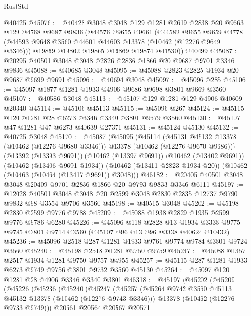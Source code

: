 \begin{lexlean}{RustStd}
\begin{coremodule}
    @40425
@45076 := @40428
    @3048
    @3048
    @129
    @1281
    @2619
    @2838
    @20
    @9663
    @129
    @4768
    @9687
    @9836
    (@44576
      @9655
      @9661
      (@44582
        @9655
        @9659
        @4778
        (@44593 @9648 @3560 @44601 @44603 @13378 (@10462 (@12276 @9649 @3346)))
        @19859
        @19862
        @19865
        @19869
        @19874
        @41530))
    @40499
@45087 := @20295 @40501 @3048 @3048 @2826 @2836 @1866 @20 @9687 @9701 @3346 @9836
@45088 := @40685 @3048
@45095 := @45088 @2823 @2825 @1934 @20 @9687 @9699 @9691
@45096 := @40694 @3048
@45097 := @45096 @285
@45106 := @45097 @1877 @1281 @1933 @4906 @9686 @9698 @3801 @9669 @3560
@45107 := @40586 @3048
@45113 := @45107 @129 @1281 @129 @4906 @40609 @20340
@45114 := @45106 @45113
@45115 := @45096 @267
@45124 := @45115 @120 @1281 @28 @6273 @3346 @3340 @3801 @9679 @3560
@45130 := @45107 @47 @1281 @47 @6273 @40639 @27371
@45131 := @45124 @45130
@45132 := @40725 @3048
@45170 := @45087
    (@45095
      (@45114
        (@45131 @45132 @13378 (@10462 (@12276 @9680 @3346)))
        @13378
        (@10462 (@12276 @9670 @9686)))
      (@13392 (@13393 @9691))
      (@10462 (@13397 @9691))
      (@10462 (@13402 @9691))
      (@10462 (@13406 @9691 @1934))
      (@10462 (@13411 @2823 @1934 @20))
      (@10462 (@10463 (@10464 (@13417 @9691)) @3048)))
@45182 := @20405 @40501 @3048 @3048 @20409 @9701 @2836 @1866 @20 @9793 @9833 @3346 @6111
@45197 := @12028
    @40501
    @3048
    @3048
    @20
    @2599
    @3048
    @2830
    @2835
    @12737
    @9790
    @9832
    @98
    @3554
    @9706
    @3560
@45198 := @40515 @3048
@45202 := @45198 @2830 @2599 @9776 @9788
@45209 := @45088 @1938 @2829 @1935 @2599 @9776 @9786 @6280
@45226 := @45096
    @118
    @2828
    @13
    @1934
    @3338
    @9775
    @9785
    @3801
    @9714
    @3560
    (@45107 @96 @13 @96 @3338 @40624 @10432)
@45236 := @45096 @2518 @287 @1281 @1933 @9761 @9774 @9784 @3801 @9724 @3560
@45240 := @45198 @2518 @1281 @9750 @9759
@45247 := @45088 @1357 @2517 @1934 @1281 @9750 @9757 @4955
@45257 := @45115 @287 @1281 @1933 @6273 @9749 @9756 @3801 @9732 @3560 @45130
@45264 := @45097 @120 @1281 @28 @4906 @3346 @3340 @3801
@45318 := @45197
    (@45202
      (@45209
        (@45226
          (@45236
            (@45240
              (@45247
                (@45257
                  (@45264 @9742 @3560 @45113 @45132 @13378 (@10462 (@12276 @9743 @3346)))
                  @13378
                  (@10462 (@12276 @9733 @9749)))
                @20561
                @20564
                @20567
                @20571

\end{coremodule}
\end{lexlean}
